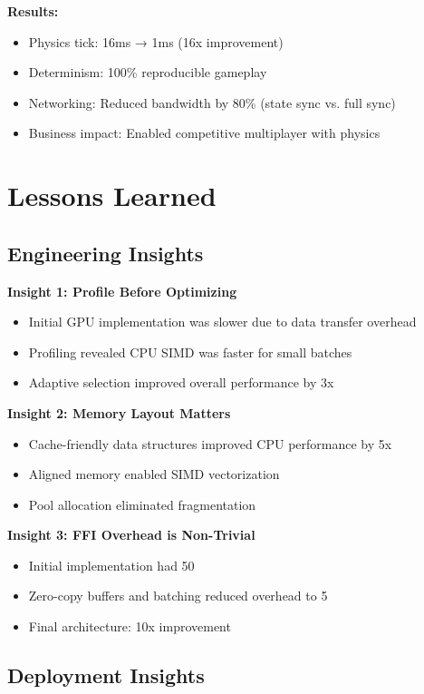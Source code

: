 \documentclass{article}
\begin{document}
\textbf{Results:}
\begin{itemize}
    \item Physics tick: 16ms → 1ms (16x improvement)
    \item Determinism: 100\% reproducible gameplay
    \item Networking: Reduced bandwidth by 80\% (state sync vs. full sync)
    \item Business impact: Enabled competitive multiplayer with physics
\end{itemize}

\section{Lessons Learned}

\subsection{Engineering Insights}

\textbf{Insight 1: Profile Before Optimizing}
\begin{itemize}
    \item Initial GPU implementation was slower due to data transfer overhead
    \item Profiling revealed CPU SIMD was faster for small batches
    \item Adaptive selection improved overall performance by 3x
\end{itemize}

\textbf{Insight 2: Memory Layout Matters}
\begin{itemize}
    \item Cache-friendly data structures improved CPU performance by 5x
    \item Aligned memory enabled SIMD vectorization
    \item Pool allocation eliminated fragmentation
\end{itemize}

\textbf{Insight 3: FFI Overhead is Non-Trivial}
\begin{itemize}
    \item Initial implementation had 50%
    \item Zero-copy buffers and batching reduced overhead to 5%
    \item Final architecture: 10x improvement
\end{itemize}

\subsection{Deployment Insights}
\end{document}
